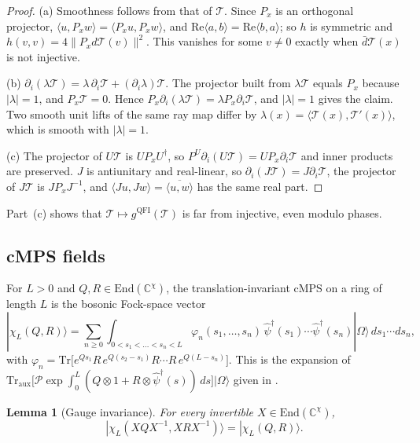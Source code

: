 \documentclass[11pt,a4paper,reqno]{amsart}
\newtheorem{lemma}[theorem]{Lemma}
\theoremstyle{definition}
\numberwithin{equation}{section}
\newcommand{\C}{\mathbb{C}}
\newcommand{\Tr}{\mathrm{Tr}}
\newcommand{\End}{\mathrm{End}}
\newcommand{\QFI}{\mathrm{QFI}}
\begin{document}
\begin{proof}
(a) Smoothness follows from that of $\mathcal{T}$. Since $P_x$ is an orthogonal projector, $\langle u,P_xw\rangle=\langle P_xu,P_xw\rangle$, and $\mathrm{Re}\langle a,b\rangle=\mathrm{Re}\langle b,a\rangle$; so $h$ is symmetric and $h(v,v)=4\|P_x d\mathcal{T}(v)\|^2$. This vanishes for some $v\neq0$ exactly when $\bar d\mathcal{T}(x)$ is not injective.

(b) $\partial_i(\lambda\mathcal{T})=\lambda\,\partial_i\mathcal{T}+(\partial_i\lambda)\mathcal{T}$. The projector built from $\lambda\mathcal{T}$ equals $P_x$ because $|\lambda|=1$, and $P_x\mathcal{T}=0$. Hence $P_x\partial_i(\lambda\mathcal{T})=\lambda P_x\partial_i\mathcal{T}$, and $|\lambda|=1$ gives the claim. Two smooth unit lifts of the same ray map differ by $\lambda(x)=\langle\mathcal{T}(x),\mathcal{T}'(x)\rangle$, which is smooth with $|\lambda|=1$.

(c) The projector of $U\mathcal{T}$ is $UP_xU^\dagger$, so $P^{U}\partial_i(U\mathcal{T})=UP_x\partial_i\mathcal{T}$ and inner products are preserved. $J$ is antiunitary and real-linear, so $\partial_i(J\mathcal{T})=J\partial_i\mathcal{T}$, the projector of $J\mathcal{T}$ is $JP_xJ^{-1}$, and $\langle Ju,Jw\rangle=\overline{\langle u,w\rangle}$ has the same real part.
\end{proof}

Part~(c) shows that $\mathcal{T}\mapsto g^{\QFI}(\mathcal{T})$ is far from injective, even modulo phases.

\subsection*{cMPS fields}
For $L>0$ and $Q,R\in\End(\C^\chi)$, the translation-invariant cMPS on a ring of length $L$ \cite{verstraete2010continuous} is the bosonic Fock-space vector
\begin{equation}\label{eq:cmps}
    |\chi_L(Q,R)\rangle=\sum_{n\ge0}\int_{0<s_1<\dots<s_n<L}\varphi_n(s_1,\dots,s_n)\,\hat\psi^\dagger(s_1)\cdots\hat\psi^\dagger(s_n)|\Omega\rangle\,ds_1\cdots ds_n,
\end{equation}
with $\varphi_n=\Tr\big[e^{Qs_1}R\,e^{Q(s_2-s_1)}R\cdots R\,e^{Q(L-s_n)}\big]$. This is the expansion of $\Tr_{\mathrm{aux}}\big[\mathcal{P}\exp\int_0^L(Q\otimes 1+R\otimes\hat\psi^\dagger(s))\,ds\big]|\Omega\rangle$ given in \cite{verstraete2010continuous}.

\begin{lemma}[Gauge invariance]\label{lem:gauge}
For every invertible $X\in\End(\C^\chi)$,
\[
|\chi_L(XQX^{-1},XRX^{-1})\rangle=|\chi_L(Q,R)\rangle .
\]
\end{lemma}
\end{document}
